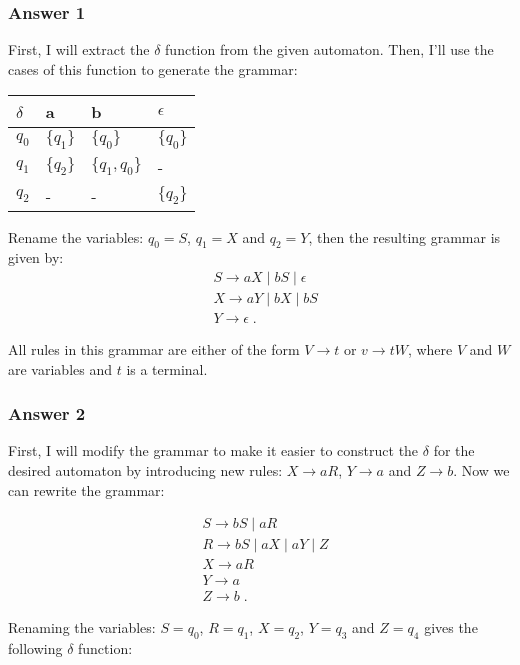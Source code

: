 \documentclass[11pt]{article}
\begin{document}
\subsubsection{Answer 1}
\label{sec:orgheadline1}
First, I will extract the \(\delta\) function from the given automaton.
Then, I'll use the cases of this function to generate the grammar:

\begin{center}
\begin{tabular}{l|lll}
\(\delta\) & a & b & \(\epsilon\)\\
\hline
\(q_0\) & \(\{q_1\}\) & \(\{q_0\}\) & \(\{q_0\}\)\\
\(q_1\) & \(\{q_2\}\) & \(\{q_1,q_0\}\) & -\\
\(q_2\) & - & - & \(\{q_2\}\)\\
\end{tabular}
\end{center}

Rename the variables: \(q_0=S\), \(q_1=X\) and \(q_2=Y\), then the resulting
grammar is given by:
\begin{align*}
  &S \to aX \;|\; bS \;|\; \epsilon \\
  &X \to aY \;|\; bX \;|\; bS \\
  &Y \to \epsilon \;.
\end{align*}


All rules in this grammar are either of the form \(V \to t\) or \(v \to tW\),
where \(V\) and \(W\) are variables and \(t\) is a terminal.

\subsubsection{Answer 2}
\label{sec:orgheadline2}
First, I will modify the grammar to make it easier to construct the \(\delta\)
for the desired automaton by introducing new rules: \(X \to aR\), \(Y \to a\)
and \(Z \to b\).  Now we can rewrite the grammar:

\begin{align*}
  &S \to bS \;|\; aR \\
  &R \to bS \;|\; aX \;|\; aY \;|\; Z \\
  &X \to aR \\
  &Y \to a \\
  &Z \to b \;.
\end{align*}

Renaming the variables: \(S=q_0\), \(R=q_1\), \(X=q_2\), \(Y=q_3\) and \(Z=q_4\) gives
the following \(\delta\) function:
\end{document}
